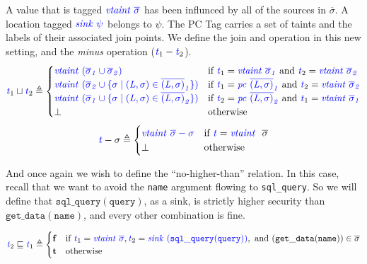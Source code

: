 \documentclass[acmsmall,review,anonymous]{acmart}\settopmatter{printfolios=true,printccs=false,printacmref=false}
\begin{document}
A value that is tagged \(\mathit{\color{blue} vtaint ~ \overline{\sigma}}\) has been influnced
by all of the sources in \(\overline{\sigma}\). A location tagged \(\mathit{\color{blue} sink ~ \psi}\)
belongs to \(\psi\). The PC Tag carries a set of taints and
the labels of their associated join points.
%
We define the join and operation in this new setting, and the {\em minus} operation (\(\mathit{\color{blue} t}_1 - \mathit{\color{blue} t}_2\)).
%
\[\mathit{\color{blue} t}_1 \sqcup \mathit{\color{blue} t}_2 \triangleq
\begin{cases}
  \mathit{\color{blue} vtaint ~ (\overline{\sigma}_1 \cup \overline{\sigma}_2)} &
  \textnormal{if } \mathit{\color{blue} t}_1 = \mathit{\color{blue} vtaint ~ \overline{\sigma}_1} \textnormal{ and }
  \mathit{\color{blue} t}_2 = \mathit{\color{blue} vtaint ~ \overline{\sigma}_2}\\
  \mathit{\color{blue} vtaint ~ (\overline{\sigma}_2 \cup \{\sigma \mid (L,\sigma) \in \overline{(L,\sigma)}_1\})} &
  \textnormal{if } \mathit{\color{blue} t}_1 = \mathit{\color{blue} pc ~ \overline{(L,\sigma)}_1} \textnormal{ and }
  \mathit{\color{blue} t}_2 = \mathit{\color{blue} vtaint ~ \overline{\sigma}_2}\\
  \mathit{\color{blue} vtaint ~ (\overline{\sigma}_1 \cup \{\sigma \mid (L,\sigma) \in \overline{(L,\sigma)}_2\})} &
  \textnormal{if } \mathit{\color{blue} t}_2 = \mathit{\color{blue} pc ~ \overline{(L,\sigma)}_2} \textnormal{ and }
  \mathit{\color{blue} t}_1 = \mathit{\color{blue} vtaint ~ \overline{\sigma}_1}\\
  \bot & \textnormal{otherwise} \\
\end{cases}\]
%
\[\mathit{\color{blue} t} - \sigma \triangleq
\begin{cases}
  \mathit{\color{blue} vtaint ~ \overline{\sigma} - \sigma} &
  \textnormal{if } \mathit{\color{blue} t} = \mathit{\color{blue} vtaint ~ ~} \overline{\sigma} \\
  \bot & \textnormal{otherwise} \\
\end{cases}\]

And once again we wish to define the ``no-higher-than'' relation. In this case,
recall that we want to avoid the {\tt name} argument flowing to {\tt sql\_query}.
So we will define that \(\mathtt{sql\_query(query)}\), as a sink, is strictly
higher security than \(\mathtt{get\_data(name)}\), and every other combination is fine.

\[\mathit{\color{blue} t}_2 \sqsubseteq \mathit{\color{blue} t}_1 \triangleq
\begin{cases}
  \mathbf{f} & \textnormal{if } \mathit{\color{blue} t}_1 = \mathit{\color{blue} vtaint ~ \overline{\sigma}},
  \mathit{\color{blue} t}_2 = \mathit{\color{blue} sink ~ \mathtt{(sql\_query(query))}}, \textnormal{ and }
  \mathtt{(get\_data(name))} \in \overline{\sigma} \\
  \mathbf{t} & \textnormal{otherwise} \\
\end{cases}\]
\end{document}
